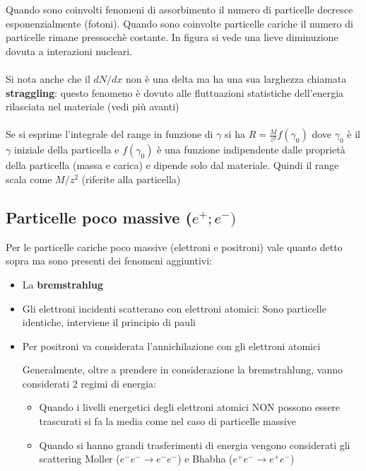 \begin{minipage}{0.48\textwidth}
    Quando sono coinvolti fenomeni di assorbimento il numero di particelle decresce esponenzialmente (fotoni).
Quando sono coinvolte particelle cariche il numero di particelle rimane pressocchè costante. In figura si vede una lieve diminuzione dovuta a interazioni nucleari.
\\
\\
Si nota anche che il $dN/dx$ non è una delta ma ha una sua larghezza chiamata \textbf{straggling}: questo fenomeno è dovuto alle fluttuazioni statistiche dell'energia rilasciata nel materiale (vedi più avanti)
\\
\\
    Se si esprime l'integrale del range in funzione di $\gamma$ si ha $R=\frac{M}{z^2}f(\gamma_0)$ dove $\gamma_0$ è il $\gamma$ iniziale della particella e $f(\gamma_0)$ è una funzione indipendente dalle proprietà della particella (massa e carica) e dipende solo dal materiale. Quindi il range scala come $M/z^2$ (riferite alla particella)

\end{minipage}
\subsection{Particelle poco massive ($e^{+} ; e^{-})$}
Per le particelle cariche poco massive (elettroni e positroni) vale quanto detto sopra ma sono presenti dei fenomeni aggiuntivi:
\begin{itemize}


    \item La \textbf{bremstrahlug}
    \item Gli elettroni incidenti scatterano con elettroni atomici: Sono particelle identiche, interviene il principio di pauli
    \item Per positroni va considerata l'annichilazione con gli elettroni atomici

    Generalmente, oltre a prendere in considerazione la bremstrahlung, vanno considerati 2 regimi di energia:
    \begin{itemize}
        \item Quando i livelli energetici degli elettroni atomici NON possono essere trascurati si fa la media come nel caso di particelle massive
        \item Quando si hanno grandi trasferimenti di energia vengono considerati gli scattering Moller ($e^- e^- \to e^- e^-$) e Bhabha ($e^+ e^- \to e^+ e^-$)
    \end{itemize}


\end{itemize}

